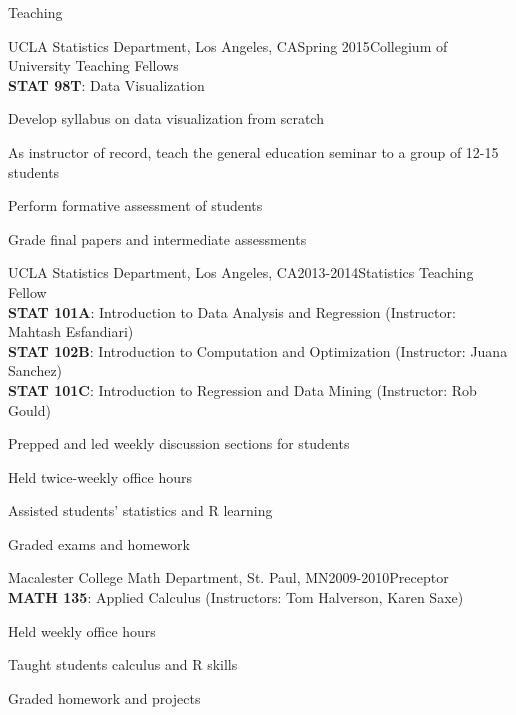 \documentclass{resume} %
\begin{document}
\clearpage
\begin{rSection}{Teaching}
\begin{rSubsection}{UCLA Statistics Department, }{Los Angeles, CA}{Spring 2015}{Collegium of University Teaching Fellows
\\ \textbf{STAT 98T}: Data Visualization}
\item Develop syllabus on data visualization from scratch
\item As instructor of record, teach the general education seminar to a group of 12-15 students
\item Perform formative assessment of students
\item Grade final papers and intermediate assessments
\end{rSubsection}


\begin{rSubsection}{UCLA Statistics Department, }{Los Angeles, CA}{2013-2014}{Statistics Teaching Fellow
\\ \textbf{STAT 101A}: Introduction to Data Analysis and Regression (Instructor: Mahtash Esfandiari)
\\ \textbf{STAT 102B}: Introduction to Computation and Optimization (Instructor: Juana Sanchez)
\\ \textbf{STAT 101C}: Introduction to Regression and Data Mining (Instructor: Rob Gould)}
\item Prepped and led weekly discussion sections for students
\item Held twice-weekly office hours
\item Assisted students' statistics and R learning
\item Graded exams and homework
\end{rSubsection}

\begin{rSubsection}{Macalester College Math Department, }{St. Paul, MN}{2009-2010}{Preceptor
\\ \textbf{MATH 135}: Applied Calculus (Instructors: Tom Halverson, Karen Saxe)}
\item Held weekly office hours
\item Taught students calculus and R skills
\item Graded homework and projects
\end{rSubsection}


\end{rSection}
\end{document}
